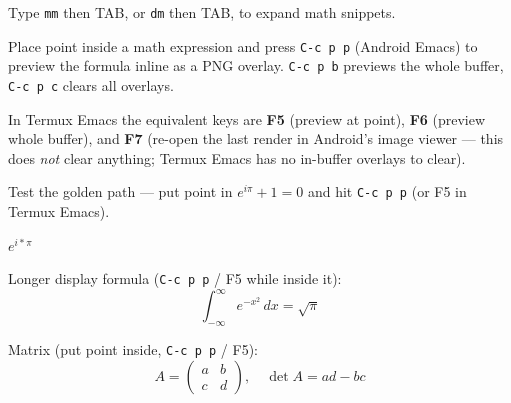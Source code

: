\documentclass{article}
\begin{document}
Type \verb|mm| then TAB, or \verb|dm| then TAB, to expand math snippets.

Place point inside a math expression and press \verb|C-c p p| (Android
Emacs) to preview the formula inline as a PNG overlay.
\verb|C-c p b| previews the whole buffer, \verb|C-c p c| clears all
overlays.

In Termux Emacs the equivalent keys are \textbf{F5} (preview at point),
\textbf{F6} (preview whole buffer), and \textbf{F7} (re-open the last
render in Android's image viewer — this does \emph{not} clear anything;
Termux Emacs has no in-buffer overlays to clear).

Test the golden path — put point in $ e^{i\pi} + 1 = 0 $ and hit
\verb|C-c p p| (or F5 in Termux Emacs).

$e^{i*\pi}$

Longer display formula (\verb|C-c p p| / F5 while inside it):
\begin{equation}
  \int _{-\infty}^{\infty} e^{-x^2}\,dx = \sqrt{\pi}
\end{equation}

Matrix (put point inside, \verb|C-c p p| / F5):
\[
  A = \begin{pmatrix} a & b \\ c & d \end{pmatrix},
  \quad \det A = ad - bc
\]
\end{document}

